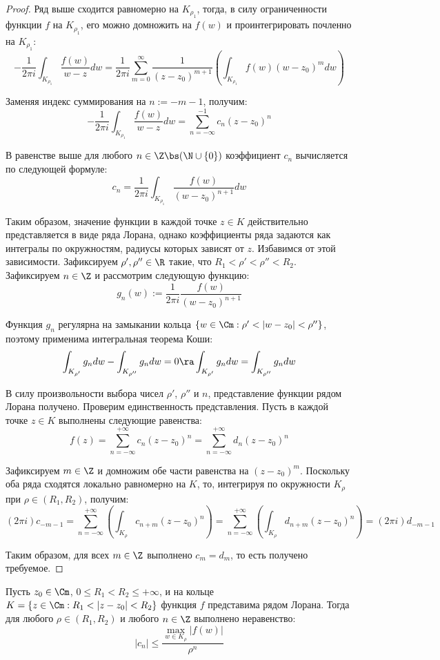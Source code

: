 \begin{proof}
	Ряд выше сходится равномерно на $K_{\rho_1}$, тогда, в силу ограниченности функции $f$ на $K_{\rho_1}$, его можно домножить на $f(w)$ и проинтегрировать почленно на $K_{\rho_1}$:
	\[- \frac1{2\pi i} \int_{K_{\rho_1}}\frac{f(w)}{w - z}dw = \frac1{2\pi i}\sum_{m=0}^\infty\frac1{(z-z_0)^{m + 1}}\left(\int_{K_{\rho_1}}f(w)(w-z_0)^mdw\right)\]
	
	Заменяя индекс суммирования на $n := -m - 1$, получим:
	\[-\frac1{2\pi i} \int_{K_{\rho_1}}\frac{f(w)}{w - z}dw = \sum_{n = -\infty}^{-1}c_n(z - z_0)^n\]
	
	В равенстве выше для любого $n \in \Z \bs (\N \cup \{0\})$ коэффициент $c_n$ вычисляется по следующей формуле:
	\[c_n = \frac1{2 \pi i}\int_{K_{\rho_1}}\frac{f(w)}{(w - z_0)^{n+1}}dw\]
	
	Таким образом, значение функции в каждой точке $z \in K$ действительно представляется в виде ряда Лорана, однако коэффициенты ряда задаются как интегралы по окружностям, радиусы которых зависят от $z$. Избавимся от этой зависимости. Зафиксируем $\rho', \rho'' \in \R$ такие, что $R_1 < \rho' < \rho'' < R_2$. Зафиксируем $n \in \Z$ и рассмотрим следующую функцию:
	\[g_n(w) := \frac1{2\pi i} \frac{f(w)}{(w - z_0)^{n+1}}\]
	
	Функция $g_n$ регулярна на замыкании кольца $\{w \in \Cm: \rho' < |w - z_0| < \rho''\}$, поэтому применима интегральная теорема Коши:
	\[\int_{K_{\rho'}}g_ndw - \int_{K_{\rho''}}g_ndw = 0 \ra \int_{K_{\rho'}}g_ndw = \int_{K_{\rho''}}g_ndw\]
	
	В силу произвольности выбора чисел $\rho'$, $\rho''$ и $n$, представление функции рядом Лорана получено. Проверим единственность представления. Пусть в каждой точке $z \in K$ выполнены следующие равенства:
	\[f(z) = \sum_{n = -\infty}^{+\infty}c_n(z - z_0)^n = \sum_{n = -\infty}^{+\infty}d_n(z - z_0)^n\]
	
	Зафиксируем $m \in \Z$ и домножим обе части равенства на $(z - z_0)^m$. Поскольку оба ряда сходятся локально равномерно на $K$, то, интегрируя по окружности $K_{\rho}$ при $\rho \in (R_1, R_2)$, получим:
	\[{(2\pi i)}{c_{-m - 1}} = \sum_{n = -\infty}^{+\infty}\left(\int_{K_{\rho}}c_{n + m}(z - z_0)^n\right) = \sum_{n = -\infty}^{+\infty}\left(\int_{K_{\rho}}d_{n + m}(z - z_0)^n\right) = {(2\pi i)}{d_{-m - 1}}\]
	
	Таким образом, для всех $m \in \Z$ выполнено $c_m = d_m$, то есть получено требуемое.
\end{proof}

\begin{proposition}
	Пусть $z_0 \in \Cm$, $0 \le R_1 < R_2 \le +\infty$, и на кольце $K = \{z \in \Cm: R_1 < |z - z_0| < R_2\}$ функция $f$ представима рядом Лорана. Тогда для любого $\rho \in (R_1, R_2)$ и любого $n \in \Z$ выполнено неравенство:
	\[|c_n| \le \frac{\max_{w \in K_{\rho}}\left|{f(w)}\right|}{\rho^n}\]
\end{proposition}

